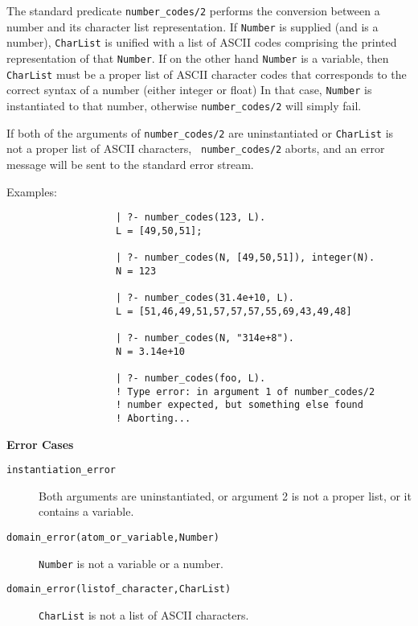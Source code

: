 \begin{description}
    The standard predicate {\tt number\_codes/2} performs the conversion 
    between a number and its character list representation. 
    If {\tt Number} is supplied (and is a number), {\tt CharList} is
    unified with a list of ASCII codes comprising the printed representation
    of that {\tt Number}.  If on the other hand {\tt Number} is a variable, 
    then {\tt CharList} must be a proper list of ASCII character codes that
    corresponds to the correct syntax of a number (either integer or float)
    In that case, {\tt Number} is instantiated to that number, otherwise
    {\tt number\_codes/2} will simply fail.

    If both of the arguments of {\tt number\_codes/2} are uninstantiated or
    {\tt CharList} is not a proper list of ASCII characters, {\tt
    number\_codes/2} aborts, and an error message will be sent to
    the standard error stream.

    Examples:
    {\footnotesize
     \begin{verbatim}
                   | ?- number_codes(123, L).
                   L = [49,50,51];

                   | ?- number_codes(N, [49,50,51]), integer(N).
                   N = 123

                   | ?- number_codes(31.4e+10, L).
                   L = [51,46,49,51,57,57,57,55,69,43,49,48]

                   | ?- number_codes(N, "314e+8").
                   N = 3.14e+10

                   | ?- number_codes(foo, L).
                   ! Type error: in argument 1 of number_codes/2
                   ! number expected, but something else found
                   ! Aborting...
     \end{verbatim}}

{\bf Error Cases}
    \begin{description}
    \item[{\tt instantiation\_error}]
	Both arguments are uninstantiated, or argument 2
	is not a proper list, or it contains a variable.
    \item[{\tt domain\_error(atom\_or\_variable,Number)}]
	{\tt Number} is not a variable or a number.
    \item[{\tt domain\_error(listof\_character,CharList)}]
	{\tt CharList} is not a list of ASCII characters.
    \end{description}


\end{description}
